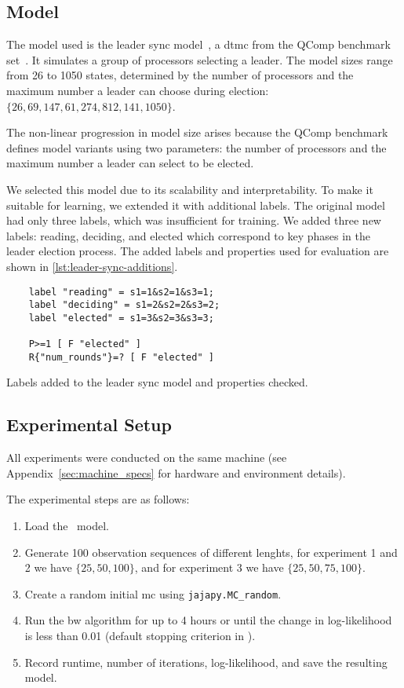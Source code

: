 \subsection{Model}
The model used is the leader sync model~\cite{IR90}, a \gls{dtmc} from the QComp benchmark set~\cite{hartmanns2019quantitative}.
It simulates a group of processors selecting a leader.
The model sizes range from 26 to 1050 states, determined by the number of processors and the maximum number a leader can choose during election: $\{26, 69, 147, 61, 274, 812, 141, 1050\}$.

The non-linear progression in model size arises because the QComp benchmark defines model variants using two parameters: the number of processors and the maximum number a leader can select to be elected.

We selected this model due to its scalability and interpretability. To make it suitable for learning, we extended it with additional labels.
The original model had only three labels, which was insufficient for training.
We added three new labels: reading, deciding, and elected which correspond to key phases in the leader election process.
The added labels and properties used for evaluation are shown in \autoref{lst:leader-sync-additions}.

\begin{listing}
    \begin{verbatim}
    label "reading" = s1=1&s2=1&s3=1;
    label "deciding" = s1=2&s2=2&s3=2;
    label "elected" = s1=3&s2=3&s3=3;

    P>=1 [ F "elected" ]
    R{"num_rounds"}=? [ F "elected" ]
    \end{verbatim}
    \caption{Labels added to the leader sync model and properties checked.}
    \label{lst:leader-sync-additions}
\end{listing}

\subsection{Experimental Setup}
All experiments were conducted on the same machine (see Appendix~\ref{sec:machine_specs} for hardware and environment details).

The experimental steps are as follows:

\begin{enumerate}
    \item Load the \Prism\ model.
    \item Generate 100 observation sequences of different lenghts, for experiment 1 and 2 we have $\{25, 50, 100\}$, and for experiment 3 we have $\{25, 50, 75, 100\}$.
    \item Create a random initial \gls{mc} using \texttt{jajapy.MC\_random}.
    \item Run the \gls{bw} algorithm for up to 4 hours or until the change in log-likelihood is less than 0.01 (default stopping criterion in \Jajapy).
    \item Record runtime, number of iterations, log-likelihood, and save the resulting model.
\end{enumerate}

